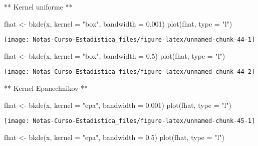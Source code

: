 \documentclass[
  12pt,
]{book}
\newenvironment{Shaded}{\begin{snugshade}}{\end{snugshade}}
\newcommand{\AttributeTok}[1]{\textcolor[rgb]{0.77,0.63,0.00}{#1}}
\newcommand{\FloatTok}[1]{\textcolor[rgb]{0.00,0.00,0.81}{#1}}
\newcommand{\FunctionTok}[1]{\textcolor[rgb]{0.00,0.00,0.00}{#1}}
\newcommand{\NormalTok}[1]{#1}
\newcommand{\OtherTok}[1]{\textcolor[rgb]{0.56,0.35,0.01}{#1}}
\newcommand{\StringTok}[1]{\textcolor[rgb]{0.31,0.60,0.02}{#1}}
\theoremstyle{definition}
\theoremstyle{definition}
\theoremstyle{definition}
\theoremstyle{definition}
\theoremstyle{remark}
\begin{document}
** Kernel uniforme **

\begin{Shaded}
\begin{Highlighting}[]
\NormalTok{fhat }\OtherTok{\textless{}{-}} \FunctionTok{bkde}\NormalTok{(x, }\AttributeTok{kernel =} \StringTok{"box"}\NormalTok{, }\AttributeTok{bandwidth =} \FloatTok{0.001}\NormalTok{)}
\FunctionTok{plot}\NormalTok{(fhat, }\AttributeTok{type =} \StringTok{"l"}\NormalTok{)}
\end{Highlighting}
\end{Shaded}

\begin{center}\texttt{[image: Notas-Curso-Estadistica\_files/figure-latex/unnamed-chunk-44-1]} \end{center}

\begin{Shaded}
\begin{Highlighting}[]
\NormalTok{fhat }\OtherTok{\textless{}{-}} \FunctionTok{bkde}\NormalTok{(x, }\AttributeTok{kernel =} \StringTok{"box"}\NormalTok{, }\AttributeTok{bandwidth =} \FloatTok{0.5}\NormalTok{)}
\FunctionTok{plot}\NormalTok{(fhat, }\AttributeTok{type =} \StringTok{"l"}\NormalTok{)}
\end{Highlighting}
\end{Shaded}

\begin{center}\texttt{[image: Notas-Curso-Estadistica\_files/figure-latex/unnamed-chunk-44-2]} \end{center}

** Kernel Epanechnikov **

\begin{Shaded}
\begin{Highlighting}[]
\NormalTok{fhat }\OtherTok{\textless{}{-}} \FunctionTok{bkde}\NormalTok{(x, }\AttributeTok{kernel =} \StringTok{"epa"}\NormalTok{, }\AttributeTok{bandwidth =} \FloatTok{0.001}\NormalTok{)}
\FunctionTok{plot}\NormalTok{(fhat, }\AttributeTok{type =} \StringTok{"l"}\NormalTok{)}
\end{Highlighting}
\end{Shaded}

\begin{center}\texttt{[image: Notas-Curso-Estadistica\_files/figure-latex/unnamed-chunk-45-1]} \end{center}

\begin{Shaded}
\begin{Highlighting}[]
\NormalTok{fhat }\OtherTok{\textless{}{-}} \FunctionTok{bkde}\NormalTok{(x, }\AttributeTok{kernel =} \StringTok{"epa"}\NormalTok{, }\AttributeTok{bandwidth =} \FloatTok{0.5}\NormalTok{)}
\FunctionTok{plot}\NormalTok{(fhat, }\AttributeTok{type =} \StringTok{"l"}\NormalTok{)}
\end{Highlighting}
\end{Shaded}
\end{document}
